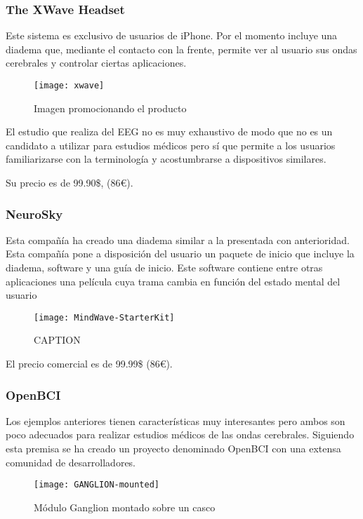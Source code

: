 \subsubsection{The XWave Headset}

Este sistema es exclusivo de usuarios de iPhone. Por el momento incluye una diadema que, mediante el contacto con la frente, permite ver al usuario sus ondas cerebrales y controlar ciertas aplicaciones.

\begin{figure} [h]
    \centering
    \texttt{[image: xwave]}
    \caption{Imagen promocionando el producto}
    \label{fig:xwave}
\end{figure}

El estudio que realiza del \acrshort{EEG} no es muy exhaustivo de modo que no es un candidato a utilizar para estudios médicos pero sí que permite a los usuarios familiarizarse con la terminología y acostumbrarse a dispositivos similares.

Su precio es de 99.90\$, (86€).

\subsubsection{NeuroSky}

Esta compañía ha creado una diadema similar a la presentada con anterioridad. Esta compañía pone a disposición del usuario un paquete de inicio que incluye la diadema, software y una guía de inicio. Este software contiene entre otras aplicaciones una película cuya trama cambia en función del estado mental del usuario

\begin{figure} [h]
    \centering
    \texttt{[image: MindWave-StarterKit]}
    \caption{CAPTION}
    \label{fig:MindWave-StarterKit}
\end{figure}

El precio comercial es de 99.99\$ (86€).

\subsubsection{OpenBCI}

Los ejemplos anteriores tienen características muy interesantes pero ambos son poco adecuados para realizar estudios médicos de las ondas cerebrales. Siguiendo esta premisa se ha creado un proyecto denominado OpenBCI con una extensa comunidad de desarrolladores.

\begin{figure} [H]
    \centering
    \texttt{[image: GANGLION-mounted]}
    \caption{Módulo Ganglion montado sobre un casco \cite{OpenBCI}}
    \label{fig:GANGLION-mounted}
\end{figure}

